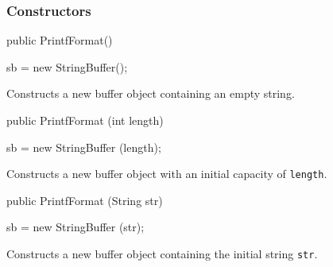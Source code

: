 \subsubsection*{Constructors}
\begin{code}

   public PrintfFormat()\begin{hide} {
      sb = new StringBuffer();
   }\end{hide}
\end{code}
\begin{tabb}  Constructs a new buffer object containing an empty string.
\end{tabb}
\begin{code}

   public PrintfFormat (int length)\begin{hide} {
      sb = new StringBuffer (length);
   }\end{hide}
\end{code}
\begin{tabb}  Constructs a new buffer object with an initial capacity of \texttt{length}.
\end{tabb}
\begin{htmlonly}
\end{htmlonly}
\begin{code}

   public PrintfFormat (String str)\begin{hide} {
      sb = new StringBuffer (str);
   }\end{hide}
\end{code}
\begin{tabb}  Constructs a new buffer object containing the initial string \texttt{str}.
\end{tabb}
\begin{htmlonly}
\end{htmlonly}


